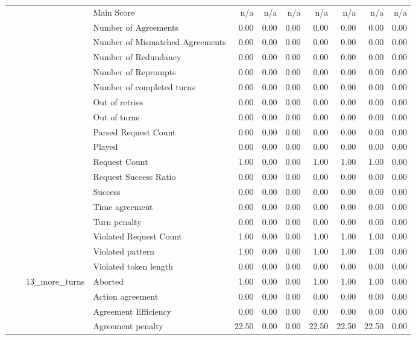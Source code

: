\begin{tabular}{llllrrrrrrr}
 &  &  & Main Score & n/a & n/a & n/a & n/a & n/a & n/a & n/a \\
 &  &  & Number of Agreements & 0.00 & 0.00 & 0.00 & 0.00 & 0.00 & 0.00 & 0.00 \\
 &  &  & Number of Mismatched Agreements & 0.00 & 0.00 & 0.00 & 0.00 & 0.00 & 0.00 & 0.00 \\
 &  &  & Number of Redundancy & 0.00 & 0.00 & 0.00 & 0.00 & 0.00 & 0.00 & 0.00 \\
 &  &  & Number of Reprompts & 0.00 & 0.00 & 0.00 & 0.00 & 0.00 & 0.00 & 0.00 \\
 &  &  & Number of completed turns & 0.00 & 0.00 & 0.00 & 0.00 & 0.00 & 0.00 & 0.00 \\
 &  &  & Out of retries & 0.00 & 0.00 & 0.00 & 0.00 & 0.00 & 0.00 & 0.00 \\
 &  &  & Out of turns & 0.00 & 0.00 & 0.00 & 0.00 & 0.00 & 0.00 & 0.00 \\
 &  &  & Parsed Request Count & 0.00 & 0.00 & 0.00 & 0.00 & 0.00 & 0.00 & 0.00 \\
 &  &  & Played & 0.00 & 0.00 & 0.00 & 0.00 & 0.00 & 0.00 & 0.00 \\
 &  &  & Request Count & 1.00 & 0.00 & 0.00 & 1.00 & 1.00 & 1.00 & 0.00 \\
 &  &  & Request Success Ratio & 0.00 & 0.00 & 0.00 & 0.00 & 0.00 & 0.00 & 0.00 \\
 &  &  & Success & 0.00 & 0.00 & 0.00 & 0.00 & 0.00 & 0.00 & 0.00 \\
 &  &  & Time agreement & 0.00 & 0.00 & 0.00 & 0.00 & 0.00 & 0.00 & 0.00 \\
 &  &  & Turn penalty & 0.00 & 0.00 & 0.00 & 0.00 & 0.00 & 0.00 & 0.00 \\
 &  &  & Violated Request Count & 1.00 & 0.00 & 0.00 & 1.00 & 1.00 & 1.00 & 0.00 \\
 &  &  & Violated pattern & 1.00 & 0.00 & 0.00 & 1.00 & 1.00 & 1.00 & 0.00 \\
 &  &  & Violated token length & 0.00 & 0.00 & 0.00 & 0.00 & 0.00 & 0.00 & 0.00 \\
\cline{3-11}
 &  & \multirow[t]{27}{*}{13_more_turns} & Aborted & 1.00 & 0.00 & 0.00 & 1.00 & 1.00 & 1.00 & 0.00 \\
 &  &  & Action agreement & 0.00 & 0.00 & 0.00 & 0.00 & 0.00 & 0.00 & 0.00 \\
 &  &  & Agreement Efficiency & 0.00 & 0.00 & 0.00 & 0.00 & 0.00 & 0.00 & 0.00 \\
 &  &  & Agreement penalty & 22.50 & 0.00 & 0.00 & 22.50 & 22.50 & 22.50 & 0.00 \\

\end{tabular}
